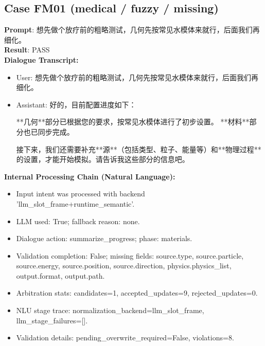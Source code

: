 \documentclass[11pt]{ctexart}
\begin{document}
\subsection{Case FM01 (medical / fuzzy / missing)}
\textbf{Prompt}: 想先做个放疗前的粗略测试，几何先按常见水模体来就行，后面我们再细化。\\
\textbf{Result}: PASS\\
\textbf{Dialogue Transcript:}
\begin{itemize}
\item User: 想先做个放疗前的粗略测试，几何先按常见水模体来就行，后面我们再细化。
\item Assistant: 好的，目前配置进度如下：

**几何**部分已根据您的要求，按常见水模体进行了初步设置。
**材料**部分也已同步完成。

接下来，我们还需要补充**源**（包括类型、粒子、能量等）和**物理过程**的设置，才能开始模拟。请告诉我这些部分的信息吧。
\end{itemize}
\textbf{Internal Processing Chain (Natural Language):}
\begin{itemize}
\item Input intent was processed with backend 'llm\_slot\_frame+runtime\_semantic'.
\item LLM used: True; fallback reason: none.
\item Dialogue action: summarize\_progress; phase: materials.
\item Validation completion: False; missing fields: source.type, source.particle, source.energy, source.position, source.direction, physics.physics\_list, output.format, output.path.
\item Arbitration stats: candidates=1, accepted\_updates=9, rejected\_updates=0.
\item NLU stage trace: normalization\_backend=llm\_slot\_frame, llm\_stage\_failures=[].
\item Validation details: pending\_overwrite\_required=False, violations=8.
\end{itemize}
\end{document}
